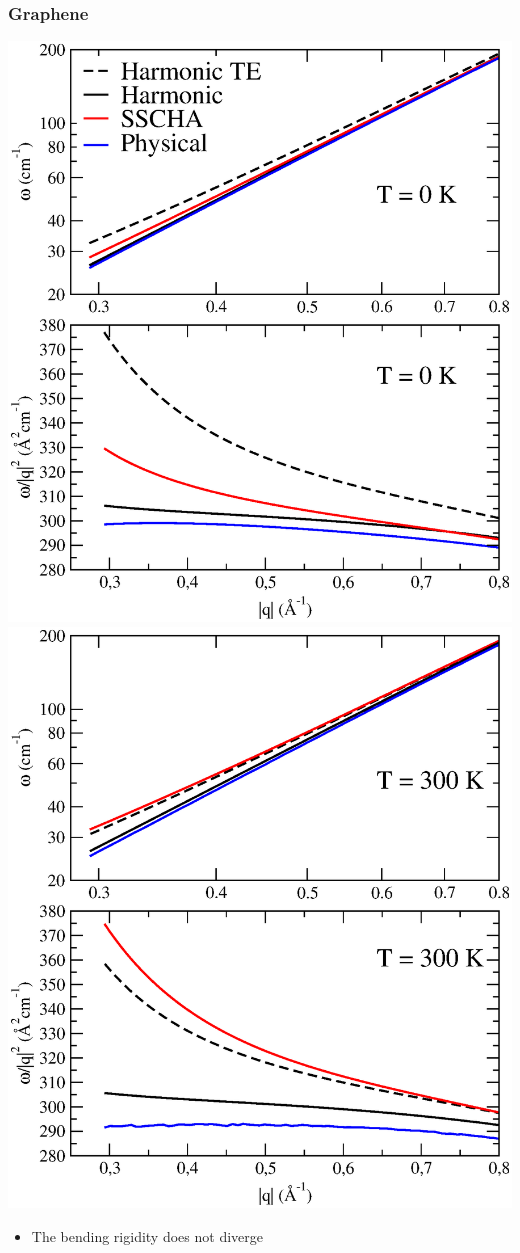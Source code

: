\documentclass{beamer}
\begin{document}

\begin{frame}

 \frametitle{Graphene}
  \begin{center}
  \includegraphics[width=0.49\linewidth]{Pictures/Graphene/T0.eps}
  \includegraphics[width=0.49\linewidth]{Pictures/Graphene/T300.eps}
 \end{center}
\begin{itemize}
 \item The bending rigidity does not diverge
\end{itemize}
 
\end{frame}

\end{document}

